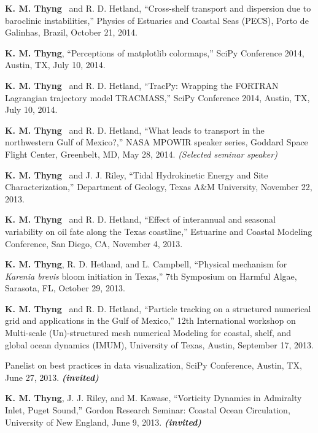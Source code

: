 \documentclass[10pt,letterpaper]{article}
\newcommand{\kmt}{\textbf{K. M. Thyng}}
\newcommand{\inv}{\textbf{\textit{(invited)}}}
\renewenvironment{itemize}{
  \begin{list}{}{
    \setlength{\leftmargin}{1.5em}
    \setlength{\itemsep}{0.25em}
    \setlength{\parskip}{0pt}
    \setlength{\parsep}{0.25em}
  }
}{
  \end{list}
}
\begin{document}
\begin{itemize}
\item \kmt~ and R. D. Hetland, ``Cross-shelf transport and dispersion due to baroclinic instabilities,'' Physics of Estuaries and Coastal Seas (PECS), Porto de Galinhas, Brazil, October 21, 2014.

\item \kmt, ``Perceptions of matplotlib colormaps,'' SciPy Conference 2014, Austin, TX, July 10, 2014.

\item \kmt~ and R. D. Hetland, ``TracPy: Wrapping the FORTRAN Lagrangian trajectory model TRACMASS,'' SciPy Conference 2014, Austin, TX, July 10, 2014.

\item \kmt~ and R. D. Hetland, ``What leads to transport in the northwestern Gulf of Mexico?,'' NASA MPOWIR speaker series, Goddard Space Flight Center, Greenbelt, MD, May 28, 2014. \textit{(Selected seminar speaker)}

\item \kmt~ and J. J. Riley, ``Tidal Hydrokinetic Energy and Site Characterization,'' Department of Geology, Texas A\&M University, November 22, 2013.

\item \kmt~ and R. D. Hetland, ``Effect of interannual and seasonal variability on oil fate along the Texas coastline,'' Estuarine and Coastal Modeling Conference, San Diego, CA, November 4, 2013.

\item \kmt, R. D. Hetland, and L. Campbell, ``Physical mechanism for \textit{Karenia brevis} bloom initiation in Texas,'' 7th Symposium on Harmful Algae, Sarasota, FL, October 29, 2013.

\item \kmt~ and R. D. Hetland, ``Particle tracking on a structured numerical grid and applications in the Gulf of Mexico,'' 12th International workshop on Multi-scale (Un)-structured mesh numerical Modeling for coastal, shelf, and global ocean dynamics (IMUM), University of Texas, Austin, September 17, 2013.

\item Panelist on best practices in data visualization, SciPy Conference, Austin, TX, June 27, 2013. \inv

\item \kmt, J. J. Riley, and M. Kawase, ``Vorticity Dynamics in Admiralty Inlet, Puget Sound,'' Gordon Research Seminar: Coastal Ocean Circulation, University of New England, June 9, 2013. \inv


\end{itemize}
\end{document}
